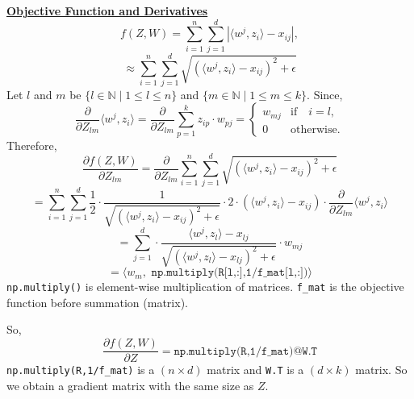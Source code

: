 \documentclass{article}
\begin{document}
\underline{\textbf{Objective Function and Derivatives}}
\[
f(Z,W) = \sum_{i=1}^n\sum_{j=1}^d |\langle w^j, z_i\rangle - x_{ij}|,
\]
\[
\approx\sum_{i=1}^n\sum_{j=1}^d \sqrt{\left(\langle w^j, z_i\rangle - x_{ij}\right)^2 + \epsilon}
\]
Let $l$ and $m$ be $\{l \in \mathbb{N} \mid 1\leq l \leq n \}$ and $\{m \in \mathbb{N} \mid 1\leq m \leq k \}$. Since,
\[
\frac{\partial}{\partial Z_{lm}}\langle w^j,z_i \rangle = \frac{\partial}{\partial Z_{lm}} \sum_{p=1}^{k} z_{ip}\cdot w_{pj} = 
\begin{cases}
w_{mj} & \text{if} \quad i=l, \\
0 & \text{otherwise}.
\end{cases}
\]
Therefore,
\[
\frac{\partial f(Z,W)}{\partial Z_{lm}} = \frac{\partial}{\partial Z_{lm}} \sum_{i=1}^n\sum_{j=1}^d \sqrt{\left(\langle w^j, z_i\rangle - x_{ij}\right)^2 + \epsilon}
\]
\[
= \sum_{i=1}^n\sum_{j=1}^d \frac{1}{2} \cdot \frac{1}{\sqrt{\left(\langle w^j, z_i\rangle - x_{ij}\right)^2 + \epsilon}} \cdot 2 \cdot \left(\langle w^j, z_i\rangle - x_{ij}\right) \cdot \frac{\partial}{\partial Z_{lm}}\langle w^j,z_i \rangle
\]
\[
= \sum_{j=1}^{d}  \cdot \frac{\langle w^j, z_l \rangle - x_{lj}}{\sqrt{\left(\langle w^j, z_l \rangle - x_{lj}\right)^2 + \epsilon}} \cdot w_{mj}
\]
\[
= \langle w_m , \texttt{ np.multiply(R[l,:],1/f\_mat[l,:])}   \rangle
\]
\texttt{np.multiply()} is element-wise multiplication of matrices. \texttt{f\_mat} is the objective function before summation (matrix).

So,
\[
\frac{\partial f(Z,W)}{\partial Z} = \texttt{np.multiply(R,1/f\_mat)@W.T}  
\]
\texttt{np.multiply(R,1/f\_mat)} is a $(n \times d)$ matrix and \texttt{W.T} is a $(d\times k)$ matrix. So we obtain a gradient matrix with the same size as $Z$.
\end{document}
